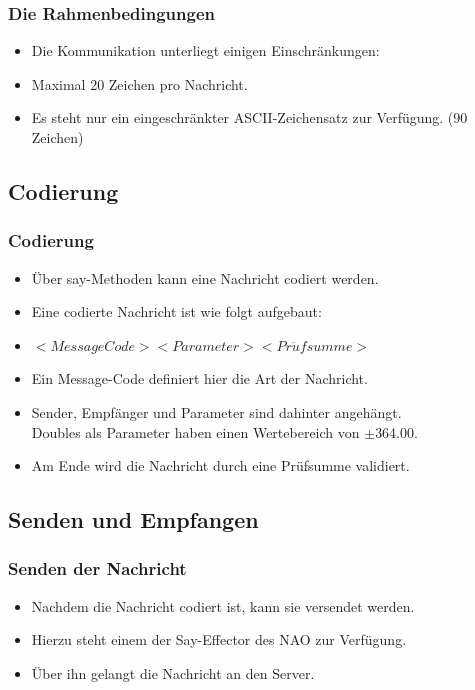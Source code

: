 \frame
{
  \frametitle{Die Rahmenbedingungen}
  \begin{itemize}
    \item<1-> Die Kommunikation unterliegt einigen Einschr\"ankungen: \vskip0.5cm
    \item<2-> Maximal 20 Zeichen pro Nachricht.
    \item<3-> Es steht nur ein eingeschr\"ankter ASCII-Zeichensatz zur Verf\"ugung. (90 Zeichen)
  \end{itemize}
}

\subsection{Codierung}
\frame
{
  \frametitle{Codierung}
  
  \begin{itemize}
    \item<1-> \"Uber say-Methoden kann eine Nachricht codiert werden.
    \item<2-> Eine codierte Nachricht ist wie folgt aufgebaut: \vskip0.5cm
    \item<3-> $<MessageCode><Parameter><Pr\ddot{u}fsumme>$ \vskip0.5cm
    \item<4-> Ein Message-Code definiert hier die Art der Nachricht.
    \item<5-> Sender, Empf\"anger und Parameter sind dahinter angeh\"angt. \\Doubles als Parameter haben einen Wertebereich von $\pm$364.00.
    \item<6-> Am Ende wird die Nachricht durch eine Pr\"ufsumme validiert.
  \end{itemize}
}

\subsection{Senden und Empfangen}
\frame
{
  \frametitle{Senden der Nachricht}
  
  \begin{itemize}
    \item<1-> Nachdem die Nachricht codiert ist, kann sie versendet werden.
    \item<2-> Hierzu steht einem der Say-Effector des NAO zur Verf\"ugung.
    \item<3-> \"Uber ihn gelangt die Nachricht an den Server.
  \end{itemize}
}

